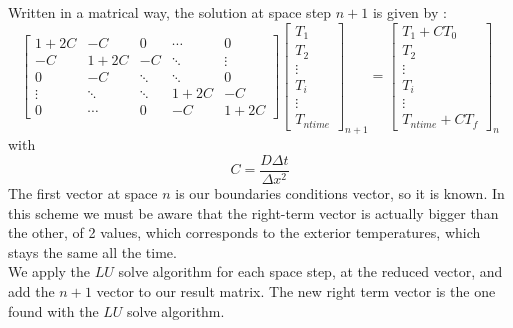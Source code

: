 \documentclass{article}
\begin{document}
                Written in a matrical way, the solution at space step $n+1$ is given by :
                \begin{equation}
                    \begin{bmatrix}
                        1+2C   & -C     & 0      & \cdots & 0 \\
                        -C     & 1+2C   & -C     & \ddots & \vdots \\
                        0      & -C     & \ddots & \ddots & 0 \\
                        \vdots & \ddots & \ddots & 1+2C   & -C\\
                        0      & \cdots & 0      & -C     & 1+2C
                    \end{bmatrix}
                    \begin{bmatrix}
                        T_{1} \\
                        T_{2} \\
                        \vdots \\
                        T_{i} \\
                        \vdots \\
                        T_{ntime}
                    \end{bmatrix}_{n+1}
                    =
                    \begin{bmatrix}
                        T_{1} + CT_{0}\\
                        T_{2} \\
                        \vdots \\
                        T_{i} \\
                        \vdots \\
                        T_{ntime} + CT_{f}
                    \end{bmatrix}_{n}
                \end{equation}
                with $$C = \frac{D\Delta t}{\Delta x ^2}  $$ 
                The first vector at space $n$ is our boundaries conditions vector, so it is known.
                In this scheme we must be aware that the right-term vector is actually bigger than
                the other, of 2 values, which corresponds to the exterior temperatures, which stays
                the same all the time.\\
                We apply the $LU$ solve algorithm for each space step, at the reduced vector, and add the $n+1$ vector to our 
                result matrix. The new right term vector is the one found with the $LU$ solve algorithm.
 
\end{document}
